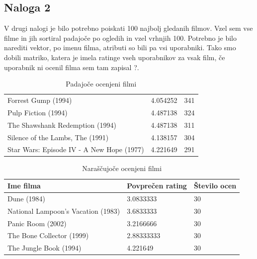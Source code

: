 \documentclass[a4paper,11pt]{article}
\begin{document}
\subsection{Naloga 2}
V drugi nalogi je bilo potrebno poiskati 100 najbolj gledanih filmov. Vzel sem vse filme in jih sortiral padajoče po ogledih in vzel vrhnjih 100. Potrebno je bilo narediti vektor, po imenu filma, atributi so bili pa vsi uporabniki. Tako smo dobili matriko, katera je imela ratinge vseh uporabnikov za vsak film, če uporabnik ni ocenil filma sem tam zapisal ?.


\begin{table}[htbp]
	\caption{Padajoče ocenjeni filmi}
	\label{tab_pad}
	\begin{center}
		\begin{tabular}{llp{3cm}}
			
			\hline
			Forrest Gump (1994) 						& 4.054252 & 341 \\
			Pulp Fiction (1994)		   					& 4.487138 & 324 \\  
			The Shawshank Redemption (1994)				& 4.487138 & 311 \\
           	Silence of the Lambs, The (1991)			& 4.138157 & 304 \\
			Star Wars: Episode IV - A New Hope (1977)	& 4.221649 & 291 \\
			\hline
		\end{tabular}
	\end{center}
\end{table}

\begin{table}[htbp]
	\caption{Naraščujoče ocenjeni filmi}
	\label{tab_nar}
	\begin{center}
		\begin{tabular}{llp{3cm}}
			\hline
			Ime filma & Povprečen rating & Število ocen \\
			\hline
			Dune (1984)			 				& 3.0833333  	& 30 \\
			National Lampoon's Vacation (1983)  & 3.6833333 	& 30 \\  
			Panic Room (2002)					& 3.2166666 	& 30 \\
			The Bone Collector (1999)			&2.88333333 	& 30 \\
			The Jungle Book (1994)				& 4.221649 		& 30 \\
			\hline
		\end{tabular}
	\end{center}
\end{table}
\pagebreak
\end{document}
